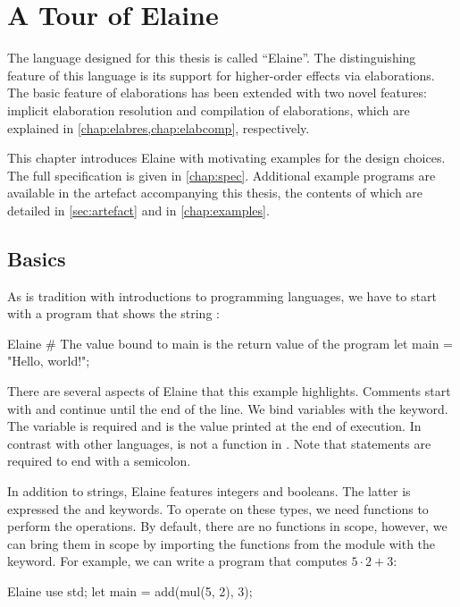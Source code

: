 \chapter{A Tour of Elaine}\label{chap:basics}

The language designed for this thesis is called ``Elaine''. The distinguishing feature of this language is its support for higher-order effects via elaborations. The basic feature of elaborations has been extended with two novel features: implicit elaboration resolution and compilation of elaborations, which are explained in \cref{chap:elabres,chap:elabcomp}, respectively.

This chapter introduces Elaine with motivating examples for the design choices. The full specification is given in \cref{chap:spec}. Additional example programs are available in the artefact accompanying this thesis, the contents of which are detailed in \cref{sec:artefact} and in \cref{chap:examples}.

\section{Basics}

As is tradition with introductions to programming languages, we have to start with a program that shows the string :

\begin{lst}{Elaine}
# The value bound to main is the return value of the program
let main = "Hello, world!";
\end{lst}

There are several aspects of Elaine that this example highlights. Comments start with \el{#} and continue until the end of the line. We bind variables with the  keyword. The  variable is required and is the value printed at the end of execution. In contrast with other languages,  is not a function in . Note that statements are required to end with a semicolon.

In addition to strings, Elaine features integers and booleans. The latter is expressed the  and  keywords. To operate on these types, we need functions to perform the operations. By default, there are no functions in scope, however, we can bring them in scope by importing the functions from the  module with the  keyword. For example, we can write a program that computes $5 \cdot 2 + 3$:

\begin{lst}{Elaine}
use std;
let main = add(mul(5, 2), 3);
\end{lst}

